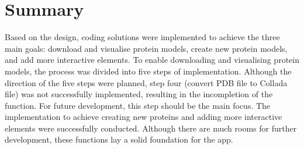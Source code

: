 \section{Summary}
Based on the design, coding solutions were implemented to achieve the three main goals: download and visualise protein models, create new protein models, and add more interactive elements. To enable downloading and visualising protein models, the process was divided into five steps of implementation. Although the direction of the five steps were planned, step four (convert PDB file to Collada file) was not successfully implemented, resulting in the incompletion of the function. For future development, this step should be the main focus. The implementation to achieve creating new proteins and adding more interactive elements were successfully conducted. Although there are much rooms for further development, these functions lay a solid foundation for the app.
